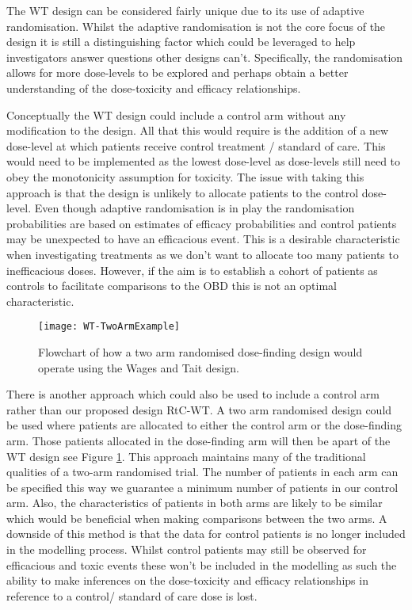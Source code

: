 The WT design can be considered fairly unique due to its use of adaptive randomisation. Whilst the adaptive randomisation is not the core focus of the design it is still a distinguishing factor which could be leveraged to help investigators answer questions other designs can't. Specifically, the randomisation allows for more dose-levels to be explored and perhaps obtain a better understanding of the dose-toxicity and efficacy relationships. 

Conceptually the WT design could include a control arm without any modification to the design. All that this would require is the addition of a new dose-level at which patients receive control treatment / standard of care. This would need to be implemented as the lowest dose-level as dose-levels still need to obey the monotonicity assumption for toxicity. The issue with taking this approach is that the design is unlikely to allocate patients to the control dose-level. Even though adaptive randomisation is in play the randomisation probabilities are based on estimates of efficacy probabilities and control patients may be unexpected to have an efficacious event. This is a desirable characteristic when investigating treatments as we don't want to allocate too many patients to inefficacious doses. However, if the aim is to establish a cohort of patients as controls to facilitate comparisons to the OBD this is not an optimal characteristic. 

\begin{figure}[!h]
	\centering
	\caption[Flowchart of a two arm randomised dose-finding trial.]{Flowchart of how a two arm randomised dose-finding design would operate using the Wages and Tait design.}
	\label{fig_wt:TwoArmExample}
	\texttt{[image: WT-TwoArmExample]}
\end{figure}

There is another approach which could also be used to include a control arm rather than our proposed design RtC-WT. A two arm randomised design could be used where patients are allocated to either the control arm or the dose-finding arm. Those patients allocated in the dose-finding arm will then be apart of the WT design see Figure \ref{fig_wt:TwoArmExample}. This approach maintains many of the traditional qualities of a two-arm randomised trial. The number of patients in each arm can be specified this way we guarantee a minimum number of patients in our control arm. Also, the characteristics of patients in both arms are likely to be similar which would be beneficial when making comparisons between the two arms. A downside of this method is that the data for control patients is no longer included in the modelling process. Whilst control patients may still be observed for efficacious and toxic events these won't be included in the modelling as such the ability to make inferences on the dose-toxicity and efficacy relationships in reference to a control/ standard of care dose is lost. 



